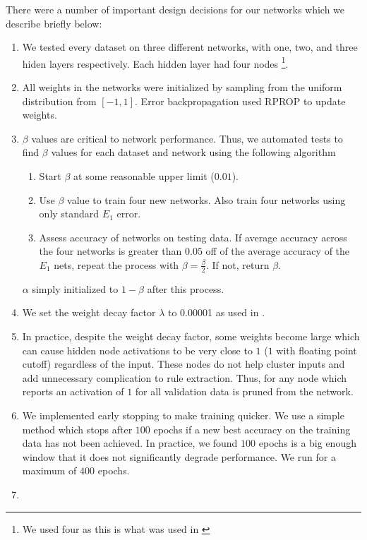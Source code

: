 There were a number of important design decisions for our networks
which we describe briefly below:

\begin{enumerate}
\item
  We tested every dataset on three different networks, with one,
  two, and three hiden layers respectively. Each hidden layer had
  four nodes \footnote{We used four as this is what was used in \cite{thuan11}}.
\item
  All weights in the networks were initialized by sampling from the
  uniform distribution from $[-1,1]$. Error backpropagation used RPROP
  to update weights.
\item
  $\beta$ values are critical to network performance. Thus, we automated
  tests to find $\beta$ values for each dataset and network using the
  following algorithm
  \begin{enumerate}
  \item
    Start $\beta$ at some reasonable upper limit ($0.01$).
  \item
    Use $\beta$ value to train four new networks. Also train four
    networks using only standard $E_1$ error.
  \item
    Assess accuracy of networks on testing data. If average accuracy
    across the four networks is greater than $0.05$ off of the average
    accuracy of the $E_1$ nets, repeat the process with
    $\beta = \frac{\beta}{2}$. If not, return $\beta$.    
  \end{enumerate}
  $\alpha$ simply initialized to $1-\beta$ after this process.
\item
  We set the weight decay factor $\lambda$ to 0.00001 as used in \cite{thuan11}.
\item
  In practice, despite the weight decay factor, some weights become large which
  can cause hidden node activations to be very close to $1$ ($1$ with floating
  point cutoff) regardless of the input. These nodes do not help cluster inputs
  and add unnecessary complication to rule extraction. Thus, for any node which
  reports an activation of $1$ for all validation data is pruned from the
  network.
\item
  We implemented early stopping to make training quicker. We use a simple
  method which stops after $100$ epochs if a new best accuracy on the
  training data has not been achieved. In practice, we found $100$ epochs is
  a big enough window that it does not significantly degrade performance.
  We run for a maximum of $400$ epochs.
\item

\end{enumerate}
